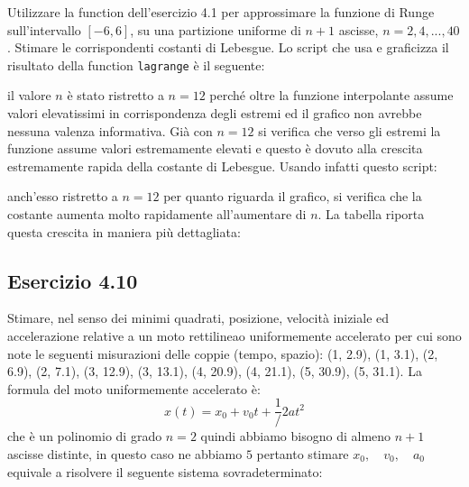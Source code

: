 Utilizzare la function dell'esercizio 4.1 per approssimare la funzione di Runge sull'intervallo $[-6,6]$, su una partizione uniforme di $n+1$ ascisse, $n= 2,4, ... ,40$. Stimare le corrispondenti costanti di Lebesgue.
\PP
Lo script che usa e graficizza il risultato della function \lstinline{lagrange} è il seguente:

il valore $n$ è stato ristretto a $n=12$ perché oltre la funzione interpolante assume valori elevatissimi in corrispondenza degli estremi ed il grafico non avrebbe nessuna valenza informativa. Già con $n=12$ si verifica che verso gli estremi la funzione assume valori estremamente elevati e questo è dovuto alla crescita estremamente rapida della costante di Lebesgue. Usando infatti questo script:

anch'esso ristretto a $n=12$ per quanto riguarda il grafico, si verifica che la costante aumenta molto rapidamente all'aumentare di $n$. La tabella riporta questa crescita in maniera più dettagliata:





	\subsection {Esercizio 4.10}

Stimare, nel senso dei minimi quadrati, posizione, velocità iniziale ed accelerazione relative a un moto rettilineao uniformemente accelerato per cui sono note le seguenti misurazioni delle coppie (tempo, spazio): (1, 2.9), (1, 3.1), (2, 6.9), (2, 7.1), (3, 12.9), (3, 13.1), (4, 20.9), (4, 21.1), (5, 30.9), (5, 31.1).
\PP
La formula del moto uniformemente accelerato è:
\begin{equation*}
	x(t) = x_0 + v_0t +\frac{1}/{2}at^2
\end{equation*}
che è un polinomio di grado $n=2$ quindi abbiamo bisogno di almeno $n+1$ ascisse distinte, in questo caso ne abbiamo $5$ pertanto stimare $x_0, \quad v_0, \quad a_0$ equivale a risolvere il seguente sistema sovradeterminato:

